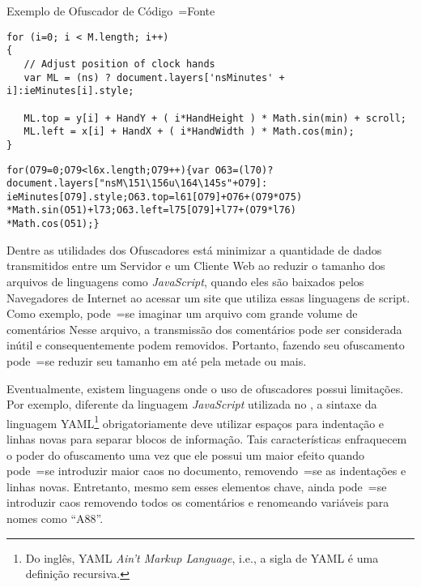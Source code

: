 \begin{quadro}[h]
\caption[Exemplo de Ofuscador de Código~=Fonte]{Exemplo de Ofuscador de Código~=Fonte \cite{familyOfSourceCodeObfuscators}}
\label{exemploDeOfuscador}
\begin{bluebox}
\lstset{xleftmargin=2em,aboveskip=0pt}

\begin{lstlisting}[caption={Antes do ofuscamento}]
for (i=0; i < M.length; i++)
{
   // Adjust position of clock hands
   var ML = (ns) ? document.layers['nsMinutes' + i]:ieMinutes[i].style;

   ML.top = y[i] + HandY + ( i*HandHeight ) * Math.sin(min) + scroll;
   ML.left = x[i] + HandX + ( i*HandWidth ) * Math.cos(min);
}
\end{lstlisting}

\begin{lstlisting}[caption={Depois do ofuscamento}]
for(O79=0;O79<l6x.length;O79++){var O63=(l70)?
document.layers["nsM\151\156u\164\145s"+O79]:
ieMinutes[O79].style;O63.top=l61[O79]+O76+(O79*O75)
*Math.sin(O51)+l73;O63.left=l75[O79]+l77+(O79*l76)
*Math.cos(O51);}
\end{lstlisting}
\end{bluebox}
\end{quadro}

Dentre as utilidades dos Ofuscadores está minimizar a quantidade de dados transmitidos entre um Servidor e
um Cliente Web ao reduzir o tamanho dos arquivos de linguagens como \textit{JavaScript},
quando eles são baixados pelos Navegadores de Internet ao acessar um site que utiliza essas linguagens de script.
Como exemplo,
pode~=se imaginar um arquivo com grande volume de comentários Nesse arquivo,
a transmissão dos comentários pode ser considerada inútil e
consequentemente podem removidos.
Portanto,
fazendo seu ofuscamento pode~=se reduzir seu tamanho em até pela metade ou
mais.

Eventualmente,
existem linguagens onde o uso de ofuscadores possui limitações.
Por exemplo,
diferente da linguagem \textit{JavaScript} utilizada no ,
a sintaxe da linguagem YAML\footnote{
Do inglês,
YAML \textit{Ain't Markup Language},
i.e.,
a sigla de YAML é uma definição recursiva.
}
\cite{yamlSpecificModelChecking} obrigatoriamente deve utilizar espaços para indentação e
linhas novas para separar blocos de informação.
Tais características enfraquecem o poder do ofuscamento uma vez que ele possui um maior efeito quando pode~=se introduzir maior caos no documento,
removendo~=se as indentações e
linhas novas. Entretanto,
mesmo sem esses elementos chave,
ainda pode~=se introduzir caos removendo todos os comentários e
renomeando variáveis para nomes  como ``A88''.



